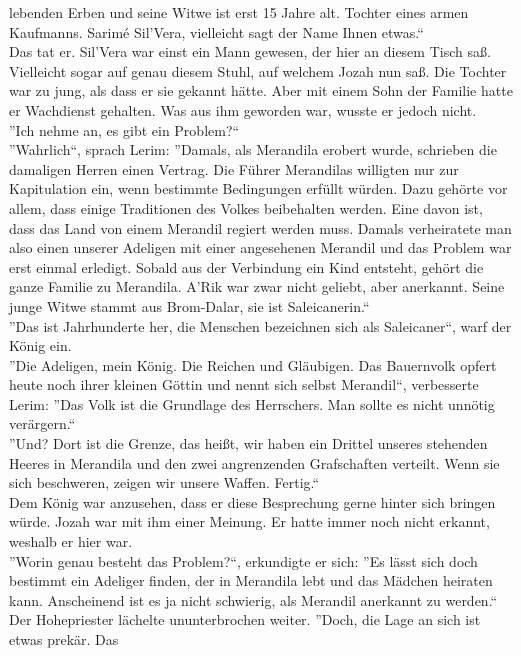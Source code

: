 lebenden Erben und seine Witwe ist erst 15 Jahre alt. Tochter eines armen Kaufmanns. Sarimé 
Sil'Vera, vielleicht sagt der Name Ihnen etwas.``\\
Das tat er. Sil'Vera war einst ein Mann gewesen, der hier an diesem Tisch saß. Vielleicht 
sogar auf genau diesem Stuhl, auf welchem Jozah nun saß. Die Tochter war zu jung, als dass er sie 
gekannt hätte. Aber mit einem Sohn der Familie hatte er Wachdienst gehalten. Was aus ihm geworden 
war, wusste er jedoch nicht.\\ 
''Ich nehme an, es gibt ein Problem?``\\
''Wahrlich``, sprach Lerim: ''Damals, als Merandila erobert wurde, schrieben die damaligen Herren 
einen Vertrag. Die Führer Merandilas willigten nur zur Kapitulation ein, wenn bestimmte Bedingungen 
erfüllt würden. Dazu gehörte vor allem, dass einige Traditionen des Volkes beibehalten werden. Eine 
davon ist, dass das Land von einem Merandil regiert werden muss. Damals verheiratete man also einen 
unserer Adeligen mit einer angesehenen Merandil und das Problem war erst einmal erledigt. Sobald 
aus der Verbindung ein Kind entsteht, gehört die ganze Familie zu Merandila. A'Rik war zwar nicht 
geliebt, aber anerkannt. Seine junge Witwe stammt aus Brom-Dalar, sie ist Saleicanerin.``\\
''Das ist Jahrhunderte her, die Menschen bezeichnen sich als Saleicaner``, warf der König ein.\\
''Die Adeligen, mein König. Die Reichen und Gläubigen. Das Bauernvolk opfert heute noch ihrer 
kleinen Göttin und nennt sich selbst Merandil``, verbesserte Lerim: ''Das Volk ist die Grundlage 
des Herrschers. Man sollte es nicht unnötig verärgern.``\\
''Und? Dort ist die Grenze, das heißt, wir haben ein Drittel unseres stehenden Heeres in Merandila 
und den zwei angrenzenden Grafschaften verteilt. Wenn sie sich beschweren, zeigen wir unsere 
Waffen. Fertig.``\\
Dem König war anzusehen, dass er diese Besprechung gerne hinter sich bringen würde. Jozah war mit 
ihm einer Meinung. Er hatte immer noch nicht erkannt, weshalb er hier war.\\
''Worin genau besteht das Problem?``, erkundigte er sich: ''Es lässt sich doch bestimmt ein 
Adeliger finden, der in Merandila lebt und das Mädchen heiraten kann. Anscheinend ist es ja nicht 
schwierig, als Merandil anerkannt zu werden.``\\
Der Hohepriester lächelte ununterbrochen weiter. ''Doch, die Lage an sich ist etwas prekär. Das 
